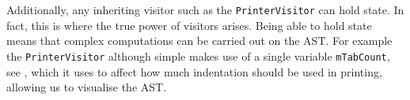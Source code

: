 Additionally, any inheriting visitor such as the
\texttt{PrinterVisitor} can hold state. In fact, this is where
the true power of visitors arises. Being able to hold state
means that complex computations can be carried out on the AST.
For example the \texttt{PrinterVisitor} although simple makes
use of a single variable \texttt{mTabCount}, see
, which it uses to affect how much
indentation should be used in printing, allowing us to visualise
the AST.


